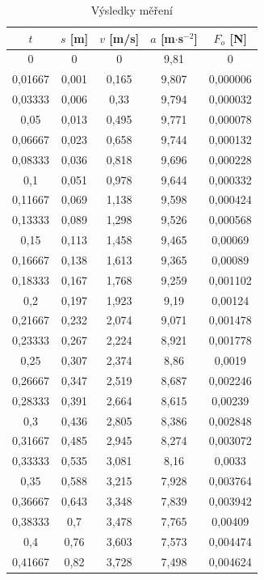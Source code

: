 \documentclass{fkssolpub}
\begin{document}
\begin{table}[h!]
	\caption{Výsledky měření}
	\begin{subtable}[c]{0.5\textwidth}
		\label{tab:b}
		\begin{tabular}{|c|c|c|c|c|}
			\hline
			$t$ & $s$ [m] & $v$ [m/s] & $a$ [m$\cdot$s$^{-2}$]& $F_o$ [N] \\
			\hline
0 & 0 & 0 & 9,81 & 0 \\
0,01667 & 0,001 & 0,165 & 9,807 & 0,000006 \\
0,03333 & 0,006 & 0,33 & 9,794 & 0,000032 \\
0,05 & 0,013 & 0,495 & 9,771 & 0,000078 \\
0,06667 & 0,023 & 0,658 & 9,744 & 0,000132 \\
0,08333 & 0,036 & 0,818 & 9,696 & 0,000228 \\
0,1 & 0,051 & 0,978 & 9,644 & 0,000332 \\
0,11667 & 0,069 & 1,138 & 9,598 & 0,000424 \\
0,13333 & 0,089 & 1,298 & 9,526 & 0,000568 \\
0,15 & 0,113 & 1,458 & 9,465 & 0,00069 \\
0,16667 & 0,138 & 1,613 & 9,365 & 0,00089 \\
0,18333 & 0,167 & 1,768 & 9,259 & 0,001102 \\
0,2 & 0,197 & 1,923 & 9,19 & 0,00124 \\
0,21667 & 0,232 & 2,074 & 9,071 & 0,001478 \\
0,23333 & 0,267 & 2,224 & 8,921 & 0,001778 \\
0,25 & 0,307 & 2,374 & 8,86 & 0,0019 \\
0,26667 & 0,347 & 2,519 & 8,687 & 0,002246 \\
0,28333 & 0,391 & 2,664 & 8,615 & 0,00239 \\
0,3 & 0,436 & 2,805 & 8,386 & 0,002848 \\
0,31667 & 0,485 & 2,945 & 8,274 & 0,003072 \\
0,33333 & 0,535 & 3,081 & 8,16 & 0,0033 \\
0,35 & 0,588 & 3,215 & 7,928 & 0,003764 \\
0,36667 & 0,643 & 3,348 & 7,839 & 0,003942 \\
0,38333 & 0,7 & 3,478 & 7,765 & 0,00409 \\
0,4 & 0,76 & 3,603 & 7,573 & 0,004474 \\
0,41667 & 0,82 & 3,728 & 7,498 & 0,004624 \\

\end{tabular}
\end{subtable}
\end{table}
\end{document}
